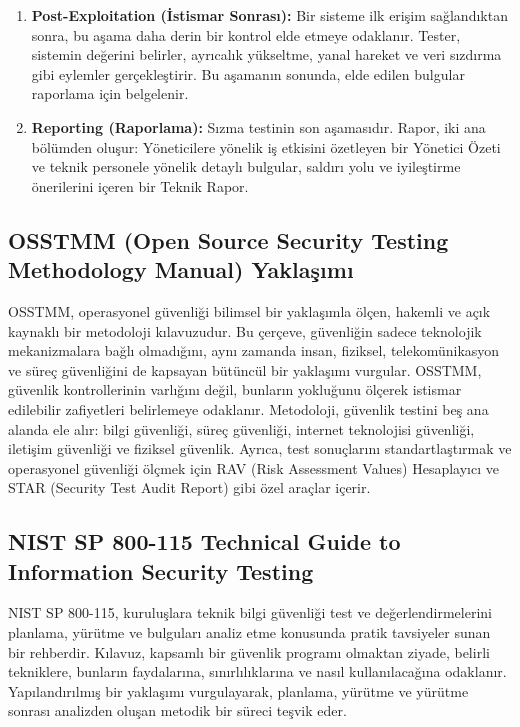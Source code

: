 \begin{enumerate}
\item \textbf{Post-Exploitation (İstismar Sonrası):} Bir sisteme ilk erişim sağlandıktan sonra, bu aşama daha derin bir kontrol elde etmeye odaklanır. Tester, sistemin değerini belirler, ayrıcalık yükseltme, yanal hareket ve veri sızdırma gibi eylemler gerçekleştirir. Bu aşamanın sonunda, elde edilen bulgular raporlama için belgelenir.
\item \textbf{Reporting (Raporlama):} Sızma testinin son aşamasıdır. Rapor, iki ana bölümden oluşur: Yöneticilere yönelik iş etkisini özetleyen bir Yönetici Özeti ve teknik personele yönelik detaylı bulgular, saldırı yolu ve iyileştirme önerilerini içeren bir Teknik Rapor.

\end{enumerate}

\subsection{OSSTMM (Open Source Security Testing Methodology Manual) Yaklaşımı}

OSSTMM, operasyonel güvenliği bilimsel bir yaklaşımla ölçen, hakemli ve açık kaynaklı bir metodoloji kılavuzudur. Bu çerçeve, güvenliğin sadece teknolojik mekanizmalara bağlı olmadığını, aynı zamanda insan, fiziksel, telekomünikasyon ve süreç güvenliğini de kapsayan bütüncül bir yaklaşımı vurgular.
OSSTMM, güvenlik kontrollerinin varlığını değil, bunların yokluğunu ölçerek istismar edilebilir zafiyetleri belirlemeye odaklanır. Metodoloji, güvenlik testini beş ana alanda ele alır: bilgi güvenliği, süreç güvenliği, internet teknolojisi güvenliği, iletişim güvenliği ve fiziksel güvenlik. Ayrıca, test sonuçlarını standartlaştırmak ve operasyonel güvenliği ölçmek için RAV (Risk Assessment Values) Hesaplayıcı ve STAR (Security Test Audit Report) gibi özel araçlar içerir.

\subsection{NIST SP 800-115 Technical Guide to Information Security Testing}

NIST SP 800-115, kuruluşlara teknik bilgi güvenliği test ve değerlendirmelerini planlama, yürütme ve bulguları analiz etme konusunda pratik tavsiyeler sunan bir rehberdir. Kılavuz, kapsamlı bir güvenlik programı olmaktan ziyade, belirli tekniklere, bunların faydalarına, sınırlılıklarına ve nasıl kullanılacağına odaklanır. Yapılandırılmış bir yaklaşımı vurgulayarak, planlama, yürütme ve yürütme sonrası analizden oluşan metodik bir süreci teşvik eder.

